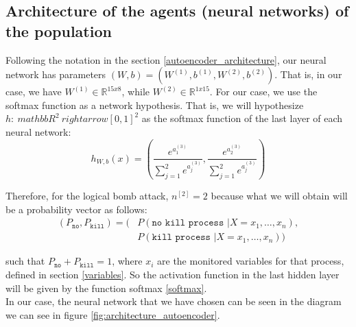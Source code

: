 \documentclass{iosart2c}
\begin{document}
\subsection{Architecture of the agents (neural networks) of the population} \label{arquitectura_agents}

Following the notation in the section \ref{autoencoder_architecture}, our neural network has parameters $(W,b)=(W^{(1)},b^{(1)},W^{(2)},b^{(2)})$. That is, in our case, we have $W^{(1)} \in \mathbb {R}^{15x8}$, while $ W^{(2)} \in \mathbb {R}^{1x15}$. For our case, we use the softmax function as a network hypothesis. That is, we will hypothesize $ h: \ mathbb {R}^ {2} \ rightarrow [0,1] ^ 2 $ as the softmax function of the last layer of each neural network: 
\begin{equation}\label{softmax}
h_{W,b}(x)=\left(\frac{e^{a_1^{(3)}}}{\sum_{j=1}^2 e^{a_j^{(3)}}},\frac{e^{a_2^{(3)}}}{\sum_{j=1}^2 e^{a_j^{(3)}}}\right)
\end{equation}


Therefore, for the logical bomb attack, $n^{[2]}=2$ because what we will obtain will be a probability vector as follows:
\begin{align*}
    (P_{\texttt{no}},P_{\texttt{kill}})=(&P(\texttt{no kill process } | X=x_1,\ldots,x_n),\\
                                         &P(\texttt{kill process } | X=x_1,\ldots,x_n))
\end{align*}

such that  $P_{\texttt{no}}+P_{\texttt{kill}}=1$, where $x_i$ are the monitored variables for that process, defined in section \ref{variables}. So the activation function in the last hidden layer will be given by the function softmax \ref{softmax}. \\


In our case, the neural network that we have chosen can be seen in the diagram we can see in figure \ref{fig:architecture_autoencoder}.\\
\end{document}
